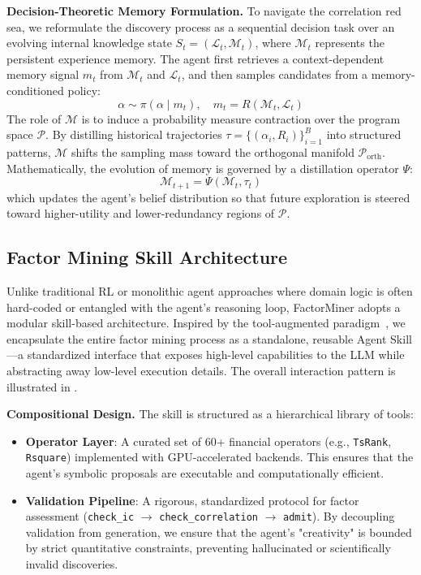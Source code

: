 \documentclass[sigconf]{acmart}
\begin{document}
\textbf{Decision-Theoretic Memory Formulation.}
To navigate the correlation red sea, we reformulate the discovery process as a sequential decision task over an evolving internal knowledge state $S_t = (\mathcal{L}_t, \mathcal{M}_t)$, where $\mathcal{M}_t$ represents the persistent experience memory. 
The agent first retrieves a context-dependent memory signal $m_t$ from $\mathcal{M}_t$ and $\mathcal{L}_t$, and then samples candidates from a memory-conditioned policy:
\begin{equation}
\label{eq:conditional-policy}
\alpha \sim \pi(\alpha \mid m_t), \quad m_t = R(\mathcal{M}_t,\mathcal{L}_t)
\end{equation}
The role of $\mathcal{M}$ is to induce a probability measure contraction over the program space $\mathcal{P}$. 
By distilling historical trajectories $\tau = \{(\alpha_i, R_i)\}_{i=1}^B$ into structured patterns, $\mathcal{M}$ shifts the sampling mass toward the orthogonal manifold $\mathcal{P}_{\text{orth}}$. 
Mathematically, the evolution of memory is governed by a distillation operator $\Psi$:
\begin{equation}
\label{eq:distillation}
\mathcal{M}_{t+1} = \Psi(\mathcal{M}_t, \tau_t)
\end{equation}
which updates the agent's belief distribution so that future exploration is steered toward higher-utility and lower-redundancy regions of $\mathcal{P}$.

\subsection{Factor Mining Skill Architecture}
\label{sec:skills}

Unlike traditional RL or monolithic agent approaches where domain logic is often hard-coded or entangled with the agent's reasoning loop, FactorMiner adopts a modular skill-based architecture. 
Inspired by the tool-augmented paradigm~\citep{schick2023toolformer}, we encapsulate the entire factor mining process as a standalone, reusable Agent Skill---a standardized interface that exposes high-level capabilities to the LLM while abstracting away low-level execution details.
The overall interaction pattern is illustrated in .

\textbf{Compositional Design.} 
The skill is structured as a hierarchical library of tools:
{\setlength{\leftmargini}{1.4em}%
\begin{itemize}
    \item \textbf{Operator Layer}: A curated set of 60+ financial operators (e.g., \texttt{TsRank}, \texttt{Rsquare}) implemented with GPU-accelerated backends. This ensures that the agent's symbolic proposals are executable and computationally efficient.
    \item \textbf{Validation Pipeline}: A rigorous, standardized protocol for factor assessment (\texttt{check\_ic} $\rightarrow$ \texttt{check\_correlation} $\rightarrow$ \texttt{admit}). By decoupling validation from generation, we ensure that the agent's "creativity" is bounded by strict quantitative constraints, preventing hallucinated or scientifically invalid discoveries.
\end{itemize}
}
\end{document}
